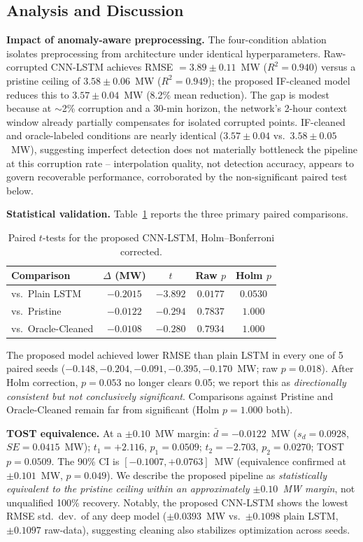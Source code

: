 \documentclass[runningheads]{llncs}
\begin{document}
\subsection{Analysis and Discussion}
\noindent\textbf{Impact of anomaly-aware preprocessing.} The four-condition ablation isolates preprocessing from architecture under identical hyperparameters. Raw-corrupted CNN-LSTM achieves RMSE $=3.89\pm0.11$~MW ($R^2=0.940$) versus a pristine ceiling of $3.58\pm0.06$~MW ($R^2=0.949$); the proposed IF-cleaned model reduces this to $3.57\pm0.04$~MW (8.2\% mean reduction). The gap is modest because at $\sim$2\% corruption and a 30-min horizon, the network's 2-hour context window already partially compensates for isolated corrupted points. IF-cleaned and oracle-labeled conditions are nearly identical ($3.57\pm0.04$ vs.\ $3.58\pm0.05$~MW), suggesting imperfect detection does not materially bottleneck the pipeline at this corruption rate -- interpolation quality, not detection accuracy, appears to govern recoverable performance, corroborated by the non-significant paired test below.

\noindent\textbf{Statistical validation.} Table~\ref{tab:stats} reports the three primary paired comparisons.

\begin{table}[t]
\caption{Paired $t$-tests for the proposed CNN-LSTM, Holm--Bonferroni corrected.}
\label{tab:stats}
\centering
\footnotesize
\begin{tabular}{@{}lcccc@{}}
\toprule
\textbf{Comparison} & \textbf{$\Delta$ (MW)} & \textbf{$t$} & \textbf{Raw $p$} & \textbf{Holm $p$} \\
\midrule
vs.\ Plain LSTM     & $-0.2015$ & $-3.892$ & $0.0177$ & $0.0530$ \\
vs.\ Pristine       & $-0.0122$ & $-0.294$ & $0.7837$ & $1.000$ \\
vs.\ Oracle-Cleaned & $-0.0108$ & $-0.280$ & $0.7934$ & $1.000$ \\
\bottomrule
\end{tabular}
\end{table}

The proposed model achieved lower RMSE than plain LSTM in every one of 5 paired seeds ($-0.148,-0.204,-0.091,-0.395,-0.170$~MW; raw $p=0.018$). After Holm correction, $p=0.053$ no longer clears 0.05; we report this as \emph{directionally consistent but not conclusively significant}. Comparisons against Pristine and Oracle-Cleaned remain far from significant (Holm $p=1.000$ both).

\noindent\textbf{TOST equivalence.} At a $\pm0.10$~MW margin: $\bar{d}=-0.0122$~MW ($s_d=0.0928$, $SE=0.0415$~MW); $t_1=+2.116$, $p_1=0.0509$; $t_2=-2.703$, $p_2=0.0270$; TOST $p=0.0509$. The 90\% CI is $[-0.1007,+0.0763]$~MW (equivalence confirmed at $\pm0.101$~MW, $p=0.049$). We describe the proposed pipeline as \emph{statistically equivalent to the pristine ceiling within an approximately $\pm0.10$~MW margin}, not unqualified 100\% recovery. Notably, the proposed CNN-LSTM shows the lowest RMSE std.\ dev.\ of any deep model ($\pm0.0393$~MW vs.\ $\pm0.1098$ plain LSTM, $\pm0.1097$ raw-data), suggesting cleaning also stabilizes optimization across seeds.
\end{document}
